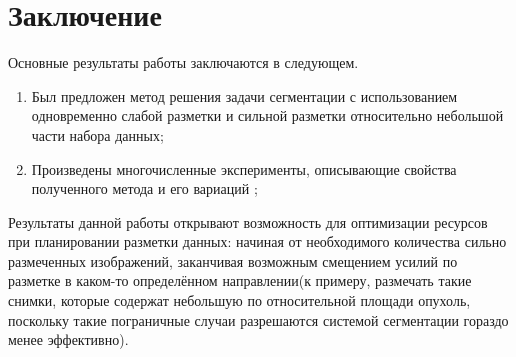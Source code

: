 \chapter*{Заключение}						%


\noindent Основные результаты работы заключаются в следующем.
%

\begin{enumerate}
    \item Был предложен метод решения задачи сегментации с использованием одновременно слабой разметки и сильной разметки относительно небольшой части набора данных;
    \item Произведены многочисленные эксперименты, описывающие свойства полученного метода и его вариаций ;
\end{enumerate}

Результаты данной работы открывают возможность для оптимизации ресурсов при планировании разметки данных: начиная от необходимого количества сильно размеченных изображений, заканчивая возможным смещением усилий по разметке в каком-то определённом направлении(к примеру, размечать такие снимки, которые содержат небольшую по относительной площади опухоль, поскольку такие пограничные случаи разрешаются системой сегментации гораздо менее эффективно). 

